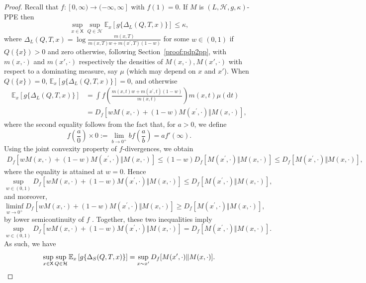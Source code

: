 \documentclass{article}
\theoremstyle{plain}
\theoremstyle{plain}
\theoremstyle{definition}
\theoremstyle{remark}
\theoremstyle{plain}
\newcommand{\rmd}{\mathrm{d}}
\newcommand{\ExMx}{\mathbb{E}_{x}}
\newcommand{\xset}{\mathsf{X}}
\begin{document}
\begin{proof}
 Recall that  $f:[0,\infty)\rightarrow (-\infty, \infty]$ with $f(1)=0$. 
If $M$ is $(L,\mathcal{H},g,\kappa)$-PPE then 
    \begin{equation*}
        \sup_{x \in \xset}\sup_{Q \in \mathcal H}\ExMx\left[g\{\Delta_L(Q,T,x)\}\right] \leq \kappa,
    \end{equation*}
where $\Delta_L(Q,T,x) = \log\frac{m(x,T)}{m(x,T)w + m(x^\prime, T)(1-w)}$ for some $w \in (0,1)$ if $Q(\{x\}) > 0$ and zero otherwise, following Section~\ref{proof:pdp2pp}, with $m(x,\cdot)$ and $m(x',\cdot) $ respectively the densities of $M(x,\cdot), M(x', \cdot)$ with respect to a dominating measure, say $\mu$ (which may depend on $x$ and $x'$). When $Q(\{x\}) = 0$, $\ExMx [g\{\Delta_L(Q,T,x)\}] = 0$, and otherwise 
\begin{align*}
    \ExMx [g\{\Delta_L(Q,T,x)\}]
    &= \int f\left(\frac{m(x,t)w + m(x^\prime, t)(1-w)}{m(x,t)}\right) m(x,t) \mu(\rmd t) \\ &= D_f[wM(x,\cdot) + (1-w) M(x^\prime,\cdot) \Vert M(x,\cdot)],
\end{align*}
where the second equality follows from the fact that, for $a > 0$, we define
\[f\left(\frac{a}{0}\right) \times 0 := \lim_{b \to 0^+} b f\left(\frac{a}{b} \right) = a f'(\infty).\]
Using the joint convexity property of $f$-divergences, we obtain
\begin{align*}
    D_f[wM(x,\cdot) + (1-w) M(x^\prime,\cdot) \Vert M(x,\cdot)] \leq  (1-w) D_f[M(x^\prime,\cdot) \Vert M(x,\cdot)] \leq D_f[M(x^\prime,\cdot) \Vert M(x,\cdot)],
\end{align*}
where the equality is attained at $w=0$. Hence 
\begin{equation*}\label{eq:maxequalityex}
    \sup_{w\in (0,1)}D_f[wM(x,\cdot) + (1-w) M(x^\prime,\cdot) \Vert M(x,\cdot)] \le D_f[M(x^\prime,\cdot) \Vert M(x,\cdot)],
\end{equation*}
and moreover,
\[\liminf_{w \to 0^+} D_f[wM(x,\cdot) + (1-w) M(x^\prime,\cdot) \Vert M(x,\cdot)] \ge D_f[M(x^\prime,\cdot) \Vert M(x,\cdot)],\]
by lower semicontinuity of $f$ \citep[Theorem~2.34]{ambrosioFunctionsBoundedVariation2000}.
Together, these two inequalities imply
\begin{equation*}
    \sup_{w\in (0,1)}D_f[wM(x,\cdot) + (1-w) M(x^\prime,\cdot) \Vert M(x,\cdot)] = D_f[M(x^\prime,\cdot) \Vert M(x,\cdot)].
\end{equation*}
As such, we have
\begin{equation*}%
        \sup_{x \in \xset}\sup_{Q \in \mathcal H}\ExMx\left[g\{\Delta_S(Q,T,x)\}\right] = \sup_{x \sim x^\prime} D_f[M(x^\prime,\cdot) \Vert M(x,\cdot)].\qedhere
\end{equation*}
\end{proof}
\end{document}
